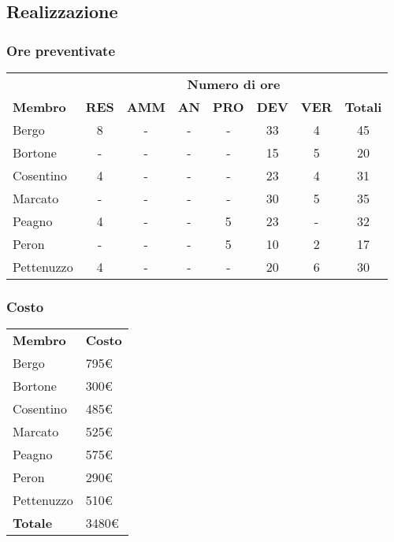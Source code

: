 		
\subsection{Realizzazione}

	\subsubsection{Ore preventivate}
		\begin{tabular}{| l | c c c c c c | c |}
			\rowcolor{LightBlue}
			& \multicolumn{7}{c}{\textbf{\color{white}Numero di ore}}	\\
	
			\rowcolor{LightBlue}
			\textbf{\color{white}Membro}
			& \textbf{\color{white}RES}
			& \textbf{\color{white}AMM}
			& \textbf{\color{white}AN}
			& \textbf{\color{white}PRO}
			& \textbf{\color{white}DEV}
			& \textbf{\color{white}VER}
			& \textbf{\color{white}Totali}\\

			Bergo      & 8 & - & - & - & 33 & 4 & 45\\
			Bortone    & - & - & - & - & 15 & 5 & 20\\
			Cosentino  & 4 & - & - & - & 23 & 4 & 31\\
			Marcato    & - & - & - & - & 30 & 5 & 35\\
			Peagno     & 4 & - & - & 5 & 23 & - & 32\\
			Peron      & - & - & - & 5 & 10 & 2 & 17\\
			Pettenuzzo & 4 & - & - & - & 20 & 6 & 30\\ \hline
		\end{tabular}
		
	\subsubsection{Costo}
		\begin{tabular}{| l | l |}
			\rowcolor{LightBlue}
			\textbf{\color{white}Membro}
			& \textbf{\color{white}Costo}\\
			
			Bergo & 795€\\
			Bortone & 300€\\
			Cosentino & 485€\\
			Marcato & 525€\\
			Peagno & 575€\\
			Peron & 290€\\
			Pettenuzzo & 510€\\ \hline
			\textbf{Totale} & 3480€\\ \hline
		\end{tabular}	